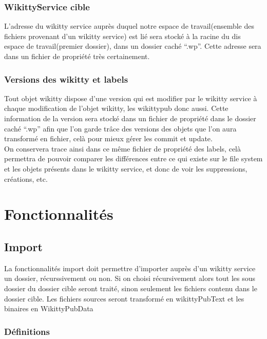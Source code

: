 \documentclass{article}
\begin{document}
\subsubsection{WikittyService cible}

L'adresse du wikitty service auprès duquel notre espace de travail(ensemble des
fichiers provenant d'un wikitty service) est lié sera stocké à la racine du dis
espace de travail(premier dossier), dans un dossier caché ``.wp\/''. Cette
adresse sera dans un fichier de propriété très certainement.

\subsubsection{Versions des wikitty et labels}

Tout objet wikitty dispose d'une version qui est modifier par le wikitty service
à chaque modification de l'objet wikitty, les wikittypub donc aussi. Cette
information de la version sera stocké dans un fichier de propriété dans le
dossier caché ``.wp\/'' afin que l'on garde trâce des versions des objets que
l'on aura transformé en fichier, celà pour mieux gérer les commit et update. \\

On conservera trace ainsi dans ce même fichier de propriété des labels, celà
permettra de pouvoir comparer les différences entre ce qui existe sur le file
system et les objets présents dans le wikitty service, et donc de voir les
suppressions, créations, etc.



\section{Fonctionnalités}



\subsection{Import}

La fonctionnalités import doit permettre d'importer auprès d'un wikitty service
un dossier, récurssivement ou non. Si on choisi récursivement alors tout les
sous dossier du dossier cible seront traité, sinon seulement les fichiers
contenu dans le dossier cible. Les fichiers sources seront transformé en
wikittyPubText et les binaires en WikittyPubData


\subsubsection{Définitions}
\end{document}
